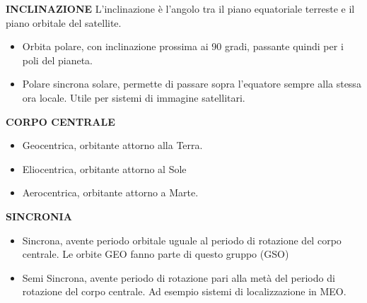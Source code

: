 \documentclass[a4paper]{article}
\begin{document}
			{\large \bf INCLINAZIONE}	
			L'inclinazione è l'angolo tra il piano equatoriale terreste e il piano orbitale del satellite.
			\begin{itemize}
				\item Orbita polare, con inclinazione prossima ai 90 gradi, passante quindi per i poli del pianeta.
				\item Polare sincrona solare, permette di passare sopra l'equatore sempre alla stessa ora locale. Utile per sistemi di immagine satellitari.
			\end{itemize}
			
			{\large \bf CORPO CENTRALE}	
			\begin{itemize}
				\item Geocentrica, orbitante attorno alla Terra.
				\item Eliocentrica, orbitante attorno al Sole
				\item Aerocentrica, orbitante attorno a Marte.
			\end{itemize}
		
		
			{\large \bf SINCRONIA}	
			\begin{itemize}
				\item Sincrona, avente periodo orbitale uguale al periodo di rotazione del corpo centrale. Le orbite GEO fanno parte di questo gruppo (GSO)
				\item Semi Sincrona, avente periodo di rotazione pari alla metà del periodo di rotazione del corpo centrale. Ad esempio sistemi di localizzazione in MEO.
			\end{itemize}
			
						
\end{document}
